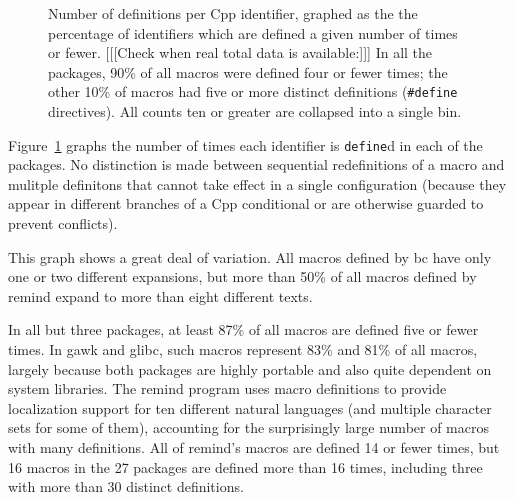\documentclass[11pt]{article}
\def\numpackages{27}
\begin{document}


\begin{figure}
\centerline{}
\caption{Number of definitions per Cpp identifier, graphed as the
  the percentage of identifiers which are defined a given number of times
  or fewer.  [[[Check when real total data is available:]]] 
  In all the packages, 90\% of all macros were defined four or
  fewer times; the other 10\% of macros had five or more distinct
  definitions ({\tt \#define} directives).  All counts ten or greater are
  collapsed into a single bin.}
\label{fig:freq-def}
\end{figure}

Figure~\ref{fig:freq-def} graphs the number of times each identifier is
{\tt define}d in each of the packages.  No distinction is made between
sequential redefinitions of a macro and mulitple definitons that cannot
take effect in a single configuration (because they appear in different
branches of a Cpp conditional or are otherwise guarded to prevent conflicts).

This graph shows a great deal of variation.  All macros defined by bc have
only one or two different expansions, but more than 50\% of all macros
defined by remind expand to more than eight different texts.

In all but three packages, at least 87\% of all macros are defined five or
fewer times.  In gawk and glibc, such macros represent 83\% and 81\% of all
macros, largely because both packages are highly portable and also quite
dependent on system libraries.  The remind program uses macro definitions
to provide localization support for ten different natural languages (and
multiple character sets for some of them), accounting for the surprisingly
large number of macros with many definitions.  All of remind's macros are
defined 14 or fewer times, but 16 macros in the {\numpackages} packages are
defined more than 16 times, including three with more than 30 distinct
definitions.
\end{document}
